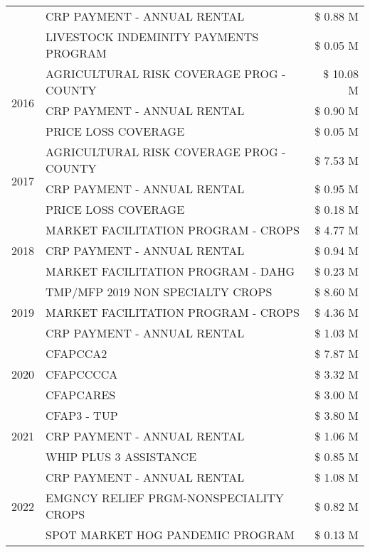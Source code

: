 \begin{tabular}{llr}
 & CRP PAYMENT - ANNUAL RENTAL & \$ 0.88 M \\
 & LIVESTOCK INDEMINITY PAYMENTS PROGRAM & \$ 0.05 M \\
\cline{1-3}
\multirow[t]{3}{*}{2016} & AGRICULTURAL RISK COVERAGE PROG - COUNTY & \$ 10.08 M \\
 & CRP PAYMENT - ANNUAL RENTAL & \$ 0.90 M \\
 & PRICE LOSS COVERAGE & \$ 0.05 M \\
\cline{1-3}
\multirow[t]{3}{*}{2017} & AGRICULTURAL RISK COVERAGE PROG - COUNTY & \$ 7.53 M \\
 & CRP PAYMENT - ANNUAL RENTAL & \$ 0.95 M \\
 & PRICE LOSS COVERAGE & \$ 0.18 M \\
\cline{1-3}
\multirow[t]{3}{*}{2018} & MARKET FACILITATION PROGRAM - CROPS & \$ 4.77 M \\
 & CRP PAYMENT - ANNUAL RENTAL & \$ 0.94 M \\
 & MARKET FACILITATION PROGRAM - DAHG & \$ 0.23 M \\
\cline{1-3}
\multirow[t]{3}{*}{2019} & TMP/MFP 2019 NON SPECIALTY CROPS & \$ 8.60 M \\
 & MARKET FACILITATION PROGRAM - CROPS & \$ 4.36 M \\
 & CRP PAYMENT - ANNUAL RENTAL & \$ 1.03 M \\
\cline{1-3}
\multirow[t]{3}{*}{2020} & CFAPCCA2 & \$ 7.87 M \\
 & CFAPCCCCA & \$ 3.32 M \\
 & CFAPCARES & \$ 3.00 M \\
\cline{1-3}
\multirow[t]{3}{*}{2021} & CFAP3 - TUP & \$ 3.80 M \\
 & CRP PAYMENT - ANNUAL RENTAL & \$ 1.06 M \\
 & WHIP PLUS 3 ASSISTANCE & \$ 0.85 M \\
\cline{1-3}
\multirow[t]{3}{*}{2022} & CRP PAYMENT - ANNUAL RENTAL & \$ 1.08 M \\
 & EMGNCY RELIEF PRGM-NONSPECIALITY CROPS & \$ 0.82 M \\
 & SPOT MARKET HOG PANDEMIC PROGRAM & \$ 0.13 M \\
\cline{1-3}
\bottomrule
\end{tabular}
